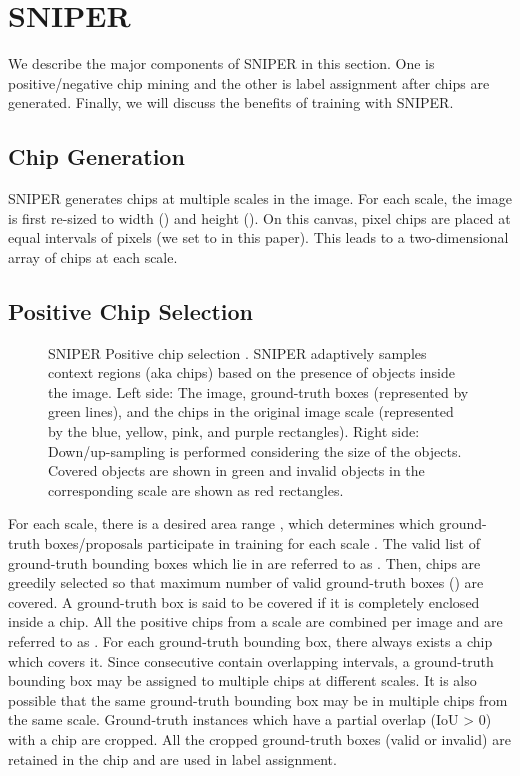 \documentclass{article}
\begin{document}
\section{SNIPER}
We describe the major components of SNIPER in this section. One is positive/negative chip mining and the other is label assignment after chips are generated. Finally, we will discuss the benefits of training with SNIPER.

\subsection{Chip Generation}
SNIPER generates chips  at multiple scales  in the image. For each scale, the image is first re-sized to width () and height (). On this canvas,  pixel chips are placed at equal intervals of  pixels (we set  to  in this paper). This leads to a two-dimensional array of chips at each scale.

\subsection{Positive Chip Selection}

\begin{figure}
\caption{SNIPER Positive chip selection . SNIPER adaptively samples context regions (aka chips) based on the presence of objects inside the image. Left side: The image, ground-truth boxes (represented by green lines), and the chips in the original image scale (represented by the blue, yellow, pink, and purple rectangles). Right side: Down/up-sampling is performed considering the size of the objects. Covered objects are shown in green and invalid objects in the corresponding scale are shown as red rectangles. }
\label{fig:pos_chips}
\end{figure} 

For each scale, there is a desired area range ,  which determines which ground-truth boxes/proposals participate in training for each scale . The valid list of ground-truth bounding boxes which lie in  are referred to as . Then, chips are greedily selected so that maximum number of valid ground-truth boxes () are covered. A ground-truth box is said to be covered if it is completely enclosed inside a chip. All the positive chips from a scale are combined per image and are referred to as . For each ground-truth bounding box, there always exists a chip which covers it. Since consecutive  contain overlapping intervals, a ground-truth bounding box may be assigned to multiple chips at different scales. It is also possible that the same ground-truth bounding box may be in multiple chips from the same scale. Ground-truth instances which have a partial overlap (IoU > 0) with a chip are cropped. All the cropped ground-truth boxes (valid or invalid) are retained in the chip and are used in label assignment.
\end{document}
